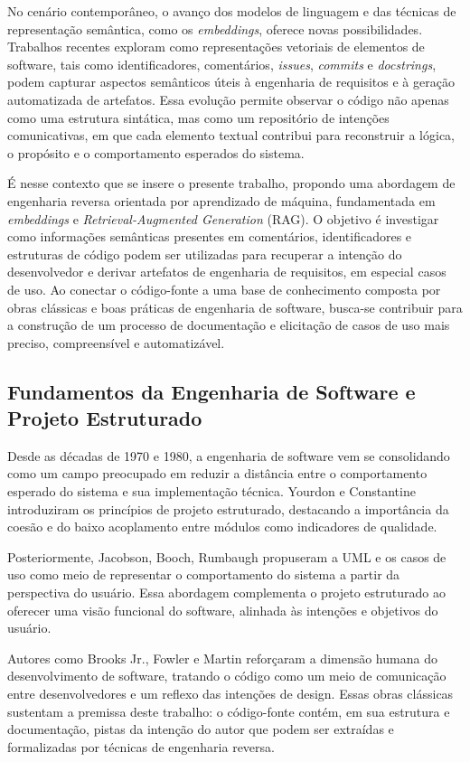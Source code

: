 \documentclass[12pt,a4paper]{article}
\begin{document}
No cenário contemporâneo, o avanço dos modelos de linguagem e das técnicas de representação semântica, como os \textit{embeddings}, oferece novas possibilidades. Trabalhos recentes exploram como representações vetoriais de elementos de software, tais como identificadores, comentários, \textit{issues}, \textit{commits} e \textit{docstrings}, podem capturar aspectos semânticos úteis à engenharia de requisitos e à geração automatizada de artefatos. Essa evolução permite observar o código não apenas como uma estrutura sintática, mas como um repositório de intenções comunicativas, em que cada elemento textual contribui para reconstruir a lógica, o propósito e o comportamento esperados do sistema.

É nesse contexto que se insere o presente trabalho, propondo uma abordagem de engenharia reversa orientada por aprendizado de máquina, fundamentada em \textit{embeddings} e \textit{Retrieval-Augmented Generation} (RAG). O objetivo é investigar como informações semânticas presentes em comentários, identificadores e estruturas de código podem ser utilizadas para recuperar a intenção do desenvolvedor e derivar artefatos de engenharia de requisitos, em especial casos de uso. Ao conectar o código-fonte a uma base de conhecimento composta por obras clássicas e boas práticas de engenharia de software, busca-se contribuir para a construção de um processo de documentação e elicitação de casos de uso mais preciso, compreensível e automatizável.

\subsection{Fundamentos da Engenharia de Software e Projeto Estruturado}

Desde as décadas de 1970 e 1980, a engenharia de software vem se consolidando como um campo preocupado em reduzir a distância entre o comportamento esperado do sistema e sua implementação técnica. Yourdon e Constantine introduziram os princípios de projeto estruturado, destacando a importância da coesão e do baixo acoplamento entre módulos como indicadores de qualidade.

Posteriormente, Jacobson, Booch, Rumbaugh propuseram a UML e os casos de uso como meio de representar o comportamento do sistema a partir da perspectiva do usuário. Essa abordagem complementa o projeto estruturado ao oferecer uma visão funcional do software, alinhada às intenções e objetivos do usuário.

Autores como Brooks Jr., Fowler e Martin reforçaram a dimensão humana do desenvolvimento de software, tratando o código como um meio de comunicação entre desenvolvedores e um reflexo das intenções de design. Essas obras clássicas sustentam a premissa deste trabalho: o código-fonte contém, em sua estrutura e documentação, pistas da intenção do autor que podem ser extraídas e formalizadas por técnicas de engenharia reversa.
\end{document}
